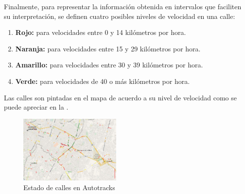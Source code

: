 Finalmente, para representar la información obtenida en intervalos que faciliten su interpretación, se definen cuatro posibles niveles de velocidad en una calle:
\begin{enumerate}
\item \textbf{Rojo:}  para velocidades entre 0 y 14 kilómetros por hora.
\item \textbf{Naranja:}  para velocidades entre 15 y 29 kilómetros por hora.
\item \textbf{Amarillo:}  para velocidades entre 30 y 39 kilómetros por hora.
\item \textbf{Verde:}  para velocidades de 40 o más kilómetros por hora.
\end{enumerate}
Las calles son pintadas en el mapa de acuerdo a su nivel de velocidad como se puede apreciar en la .
\begin{figure}[h]
	\centering
	\includegraphics[width=0.45\textwidth]{apartados/figuras/estado_calles.jpg}
	\caption{\label{fig:calles} Estado de calles en Autotracks}	
\end{figure}
